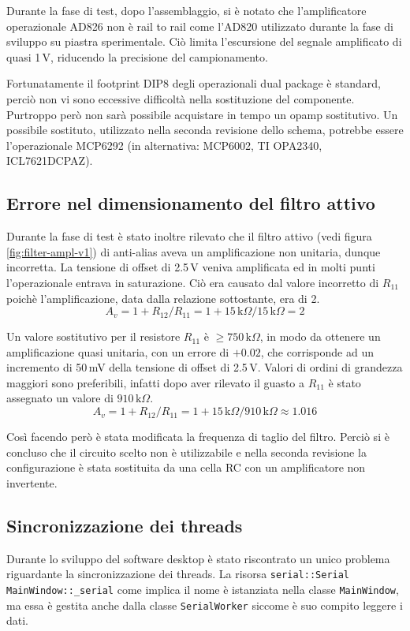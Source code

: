 Durante la fase di test, dopo l'assemblaggio, si \`e notato che
l'amplificatore operazionale AD826 non \`e rail to rail come l'AD820
utilizzato durante la fase di sviluppo su piastra sperimentale.  Ci\`o limita
l'escursione del segnale amplificato di quasi 1\,V, riducendo la precisione
del campionamento.

Fortunatamente il footprint DIP8 degli operazionali dual package \`e standard,
perci\`o non vi sono eccessive difficolt\`a nella sostituzione del componente.
Purtroppo per\`o non sar\`a possibile acquistare in tempo un opamp
sostitutivo. Un possibile sostituto, utilizzato nella seconda revisione dello
schema, potrebbe essere l'operazionale MCP6292 (in alternativa: MCP6002, TI
OPA2340, ICL7621DCPAZ).

\subsection{Errore nel dimensionamento del filtro attivo}
\label{sec:err-filter}

Durante la fase di test \`e stato inoltre rilevato che il filtro attivo (vedi
figura \ref{fig:filter-ampl-v1}) di anti-alias aveva un amplificazione non
unitaria, dunque incorretta.  La tensione di offset di 2.5\,V veniva
amplificata ed in molti punti l'operazionale entrava in saturazione.  Ci\`o
era causato dal valore incorretto di \(R_{11}\) poich\`e l'amplificazione,
data dalla relazione sottostante, era  di 2.
\[
    A_v = 1+R_{12}/R_{11} = 1+15\,\text{k}\Omega/15\,\text{k}\Omega = 2
\]

Un valore sostitutivo per il resistore \(R_{11}\) \`e
\(\geq 750\,\text{k}\Omega\), in modo da ottenere un amplificazione quasi
unitaria, con un errore di \(+0.02\), che corrisponde ad un incremento di
50\,mV della tensione di offset di 2.5\,V. Valori di ordini di grandezza
maggiori sono preferibili, infatti dopo aver rilevato il guasto a \(R_{11}\)
\`e stato assegnato un valore di \(910\,\text{k}\Omega\).
\[
    A_v = 1+R_{12}/R_{11} = 1+15\,\text{k}\Omega/910\,\text{k}\Omega \approx 1.016
\]

Cos\`i facendo per\`o \`e stata modificata la frequenza di taglio del filtro.
Perci\`o si \`e concluso che il circuito scelto non \`e utilizzabile e nella
seconda revisione la configurazione \`e stata sostituita da una cella RC con
un amplificatore non invertente.

\subsection{Sincronizzazione dei threads}
\label{sec:err-sync}
Durante lo sviluppo del software desktop \`e stato riscontrato un unico
problema riguardante la sincronizzazione dei threads. La risorsa
\texttt{serial::Serial MainWindow::\_serial}  come implica il nome \`e
istanziata nella classe \texttt{MainWindow}, ma essa \`e gestita anche dalla
classe \texttt{SerialWorker} siccome \`e suo compito leggere i dati.

